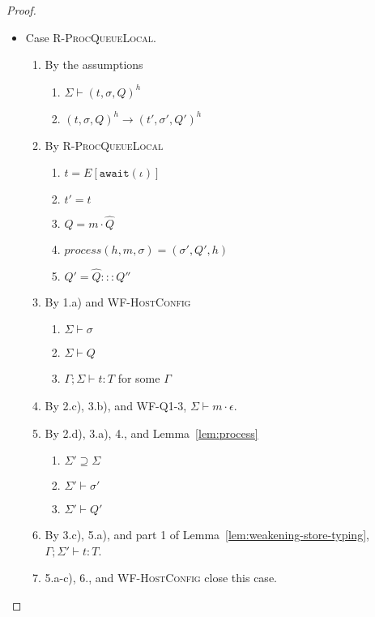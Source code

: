 \documentclass{article}
\theoremstyle{definition}
\begin{document}
\begin{proof}
\begin{itemize}
\begin{enumerate}
\end{enumerate}

\item Case \textsc{R-ProcQueueLocal}.
\begin{enumerate}
\item By the assumptions
  \begin{enumerate}[label=(\alph*)]
  \item $\Sigma \vdash (t, \sigma, Q)^h$
  \item $(t, \sigma, Q)^h \longrightarrow (t', \sigma', Q')^h$
  \end{enumerate}
\item By \textsc{R-ProcQueueLocal}
  \begin{enumerate}[label=(\alph*)]
  \item $t = E[\texttt{await}(\iota)]$
  \item $t' = t$
  \item $Q = m \cdot \hat{Q}$
  \item $process(h, m, \sigma) = (\sigma', Q', h)$
  \item $Q' = \hat{Q} ::: Q''$
  \end{enumerate}
\item By 1.a) and \textsc{WF-HostConfig}
  \begin{enumerate}[label=(\alph*)]
  \item $\Sigma \vdash \sigma$
  \item $\Sigma \vdash Q$
  \item $\Gamma ; \Sigma \vdash t : T$ for some $\Gamma$
  \end{enumerate}
\item By 2.c), 3.b), and \textsc{WF-Q1-3}, $\Sigma \vdash m \cdot \epsilon$.
\item By 2.d), 3.a), 4., and Lemma~\ref{lem:process}
  \begin{enumerate}[label=(\alph*)]
  \item $\Sigma' \supseteq \Sigma$
  \item $\Sigma' \vdash \sigma'$
  \item $\Sigma' \vdash Q'$
  \end{enumerate}
\item By 3.c), 5.a), and part 1 of Lemma~\ref{lem:weakening-store-typing}, $\Gamma ; \Sigma' \vdash t : T$.
\item 5.a-c), 6., and \textsc{WF-HostConfig} close this case.

\end{enumerate}
\end{itemize}


\end{proof}
\end{document}

